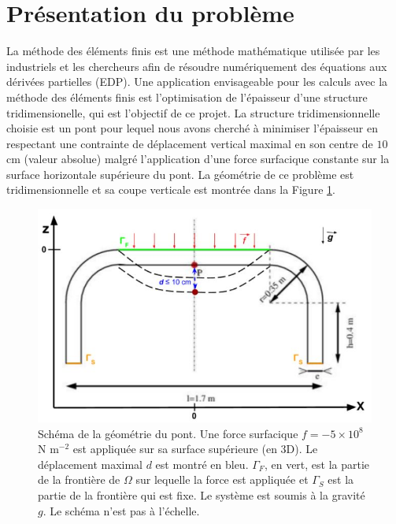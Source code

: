 \documentclass{article}
\begin{document}
    

    \section{Présentation du problème}
    La méthode des éléments finis est une méthode mathématique utilisée par les industriels et les chercheurs 
    afin de résoudre numériquement des équations aux dérivées partielles (EDP). 
    Une application envisageable pour les calculs avec la méthode des éléments finis est l'optimisation de l'épaisseur d'une structure tridimensionelle, 
    qui est l'objectif de ce projet. 
    La structure tridimensionnelle choisie est un pont pour lequel nous avons cherché à minimiser l'épaisseur
    en respectant une contrainte de déplacement vertical maximal en son centre de $10$ cm (valeur absolue) malgré l'application d'une force surfacique
    constante sur la surface horizontale supérieure du pont. 
    La géométrie de ce problème est tridimensionnelle et sa coupe verticale est montrée dans la Figure \ref{fig:problem}.
    \begin{figure}[H]        
    \begin{center}
	
        \includegraphics[width=12cm]{imgs/coupe_2D-schema.JPG}
        \caption{Schéma de la géométrie du pont. Une force surfacique $f= - 5\times10^8$ N m$^{-2}$ est appliquée sur sa surface supérieure (en 3D).
        Le déplacement maximal $d$ est montré en bleu. $\Gamma_F$, en vert, est la partie de la frontière de $\Omega$ sur lequelle la force est appliquée et $\Gamma_S$ est la partie de la frontière qui est fixe. 
        Le système est soumis à la gravité $g$.
        Le schéma n'est pas à l'échelle.}
        \label{fig:problem}
    
	\end{center}
    \end{figure}
    
\end{document}

